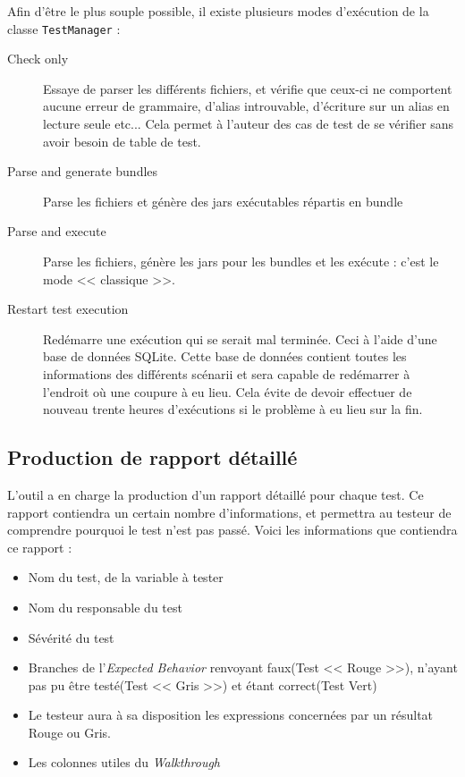 Afin d'être le plus souple possible, il existe plusieurs modes d'exécution de la classe \texttt{TestManager} : 
\begin{description}
	\item[Check only] Essaye de parser les différents fichiers, et vérifie que ceux-ci ne comportent aucune erreur de grammaire, d'alias introuvable, d'écriture sur un alias en lecture seule etc... Cela permet à l'auteur des cas de test de se vérifier sans avoir besoin de table de test.
	\item[Parse and generate bundles] Parse les fichiers et génère des jars exécutables répartis en bundle
	\item[Parse and execute] Parse les fichiers, génère les jars pour les bundles et les exécute : c'est le mode << classique >>.
	\item[Restart test execution] Redémarre une exécution qui se serait mal terminée. Ceci à l'aide d'une base de données SQLite. Cette base de données contient toutes les informations des différents scénarii et sera capable de redémarrer à l'endroit où une coupure à eu lieu. Cela évite de devoir effectuer de nouveau trente heures d'exécutions si le problème à eu lieu sur la fin.
\end{description}

\subsection{Production de rapport détaillé}\label{report}
L'outil a en charge la production d'un rapport détaillé pour chaque test. Ce rapport contiendra un certain nombre d'informations, et permettra au testeur de comprendre pourquoi le test n'est pas passé. Voici les informations que contiendra ce rapport : 

\begin{itemize}
	\item Nom du test, de la variable à tester
	\item Nom du responsable du test
	\item Sévérité du test
	\item Branches de l'\textit{Expected Behavior} renvoyant faux(Test << Rouge >>), n'ayant pas pu être testé(Test << Gris >>) et étant correct(Test Vert)
	\item Le testeur aura à sa disposition les expressions concernées par un résultat Rouge ou Gris.
	\item Les colonnes utiles du \textit{Walkthrough}
\end{itemize}

